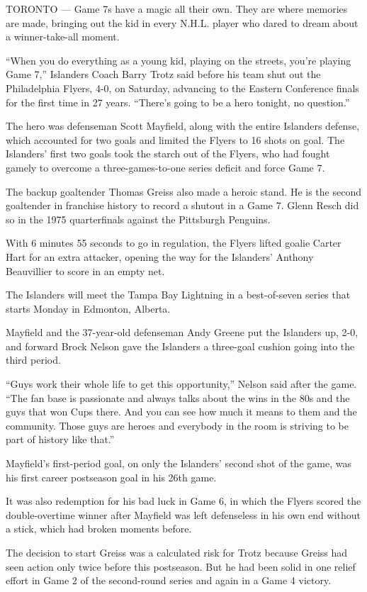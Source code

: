 TORONTO --- Game 7s have a magic all their own. They are where memories
are made, bringing out the kid in every N.H.L. player who dared to dream
about a winner-take-all moment.

``When you do everything as a young kid, playing on the streets, you're
playing Game 7,'' Islanders Coach Barry Trotz said before his team shut
out the Philadelphia Flyers, 4-0, on Saturday, advancing to the Eastern
Conference finals for the first time in 27 years. ``There's going to be
a hero tonight, no question.''

The hero was defenseman Scott Mayfield, along with the entire Islanders
defense, which accounted for two goals and limited the Flyers to 16
shots on goal. The Islanders' first two goals took the starch out of the
Flyers, who had fought gamely to overcome a three-games-to-one series
deficit and force Game 7.

The backup goaltender Thomas Greiss also made a heroic stand. He is the
second goaltender in franchise history to record a shutout in a Game 7.
Glenn Resch did so in the 1975 quarterfinals against the Pittsburgh
Penguins.

With 6 minutes 55 seconds to go in regulation, the Flyers lifted goalie
Carter Hart for an extra attacker, opening the way for the Islanders'
Anthony Beauvillier to score in an empty net.

The Islanders will meet the Tampa Bay Lightning in a best-of-seven
series that starts Monday in Edmonton, Alberta.

Mayfield and the 37-year-old defenseman Andy Greene put the Islanders
up, 2-0, and forward Brock Nelson gave the Islanders a three-goal
cushion going into the third period.

``Guys work their whole life to get this opportunity,'' Nelson said
after the game. ``The fan base is passionate and always talks about the
wins in the 80s and the guys that won Cups there. And you can see how
much it means to them and the community. Those guys are heroes and
everybody in the room is striving to be part of history like that.''

Mayfield's first-period goal, on only the Islanders' second shot of the
game, was his first career postseason goal in his 26th game.

It was also redemption for his bad luck in Game 6, in which the Flyers
scored the double-overtime winner after Mayfield was left defenseless in
his own end without a stick, which had broken moments before.

The decision to start Greiss was a calculated risk for Trotz because
Greiss had seen action only twice before this postseason. But he had
been solid in one relief effort in Game 2 of the second-round series and
again in a Game 4 victory.

